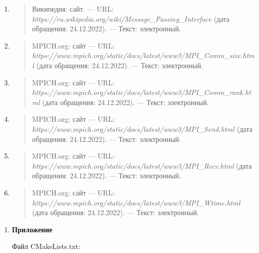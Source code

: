 \documentclass[]{article}
\begin{document}
\begin{enumerate}
\def\labelenumi{\arabic{enumi}.}
\item
  \begin{quote}
  Википедия: сайт. --- URL:
  \emph{https://ru.wikipedia.org/wiki/Message\_Passing\_Interface} (дата
  обращения: 24.12.2022). --- Текст: электронный.
  \end{quote}
\item
  \begin{quote}
  MPICH.org: сайт --- URL:
  \emph{https://www.mpich.org/static/docs/latest/www3/MPI\_Comm\_size.html}
  (дата обращения: 24.12.2022). --- Текст: электронный.
  \end{quote}
\item
  \begin{quote}
  MPICH.org: сайт --- URL:
  \emph{https://www.mpich.org/static/docs/latest/www3/MPI\_Comm\_rank.html}
  (дата обращения: 24.12.2022). --- Текст: электронный.
  \end{quote}
\item
  \begin{quote}
  MPICH.org: сайт --- URL:
  \emph{https://www.mpich.org/static/docs/latest/www3/MPI\_Send.html}
  (дата обращения: 24.12.2022). --- Текст: электронный.
  \end{quote}
\item
  \begin{quote}
  MPICH.org: сайт --- URL:
  \emph{https://www.mpich.org/static/docs/latest/www3/MPI\_Recv.html}
  (дата обращения: 24.12.2022). --- Текст: электронный.
  \end{quote}
\item
  \begin{quote}
  MPICH.org: сайт --- URL:
  \emph{https://www.mpich.org/static/docs/latest/www3/MPI\_Wtime.html}
  (дата обращения: 24.12.2022). --- Текст: электронный.
  \end{quote}
\end{enumerate}

\begin{enumerate}
\def\labelenumi{\arabic{enumi}.}
\setcounter{enumi}{1}
\item
  \textbf{Приложение}

  Файл CMakeLists.txt:
\end{enumerate}
\end{document}
